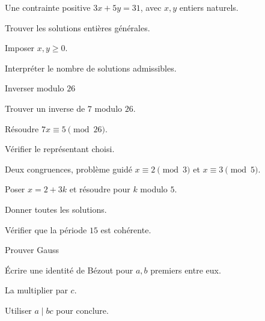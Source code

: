 \begingroup\renewcommand{\otBesoinPlace}[1]{}\begin{minipage}{\linewidth}
\begin{exercice}[3]{Une contrainte positive}
$3x+5y=31$, avec $x,y$ entiers naturels.
\begin{questions}
\item Trouver les solutions entières générales.
\item Imposer $x,y\geq0$.
\item Interpréter le nombre de solutions admissibles.
\end{questions}
\end{exercice}
\begin{exercice}[3]{Inverser modulo $26$}

\begin{questions}
\item Trouver un inverse de $7$ modulo $26$.
\item Résoudre $7x\equiv5\pmod{26}$.
\item Vérifier le représentant choisi.
\end{questions}
\end{exercice}
\begin{exercice}[3]{Deux congruences, problème guidé}
$x\equiv2\pmod3$ et $x\equiv3\pmod5$.
\begin{questions}
\item Poser $x=2+3k$ et résoudre pour $k$ modulo $5$.
\item Donner toutes les solutions.
\item Vérifier que la période $15$ est cohérente.
\end{questions}
\end{exercice}
\begin{exercice}[3]{Prouver Gauss}

\begin{questions}
\item Écrire une identité de Bézout pour $a,b$ premiers entre eux.
\item La multiplier par $c$.
\item Utiliser $a\mid bc$ pour conclure.
\end{questions}
\end{exercice}
\end{minipage}\endgroup
